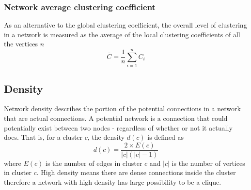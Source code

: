 \documentclass{article}
\begin{document}
\subsubsection{Network average clustering coefficient}
As an alternative to the global clustering coefficient, the overall level of clustering in a network is measured as the average of the local clustering coefficients of all the vertices $n$
\begin{equation*}
\bar{C} = \frac{1}{n} \sum_{i=1}^nC_i
\end{equation*}
\subsection{Density} 
Network density describes the portion of the potential connections in a network that are actual connections. A potential network is a connection that could potentially exist between two nodes - regardless of whether or not it actually does. That is, for a cluster $c$, the density $d(c)$ is defined as\\
\begin{equation*}
d(c) = \frac{2 \times E(c)}{|c|(|c|-1)}
\end{equation*}
where $E(c)$ is the number of edges in cluster $c$ and $|c|$ is the number of vertices in cluster $c$.
High density means there are dense connections inside the cluster therefore a network with high density has large possibility to be a clique.
\end{document}
